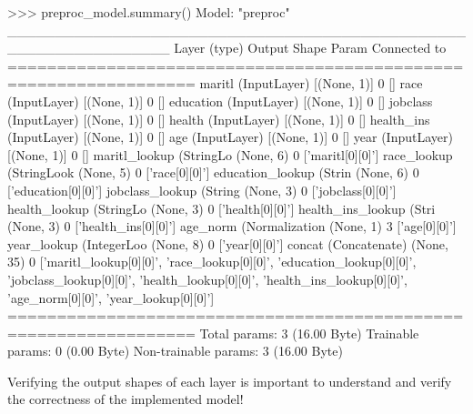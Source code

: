 \begin{textcode}
>>> preproc_model.summary()
Model: "preproc"
_________________________________________________________________
Layer (type)            Output Shape Param Connected to                
=================================================================
maritl (InputLayer)     [(None, 1)]  0     []                            
race (InputLayer)       [(None, 1)]  0     []                            
education (InputLayer)  [(None, 1)]  0     []                            
jobclass (InputLayer)   [(None, 1)]  0     []                            
health (InputLayer)     [(None, 1)]  0     []                            
health_ins (InputLayer) [(None, 1)]  0     []                            
age (InputLayer)        [(None, 1)]  0     []                            
year (InputLayer)       [(None, 1)]  0     []                            
maritl_lookup (StringLo (None, 6)    0     ['maritl[0][0]']              
race_lookup (StringLook (None, 5)    0     ['race[0][0]']                
education_lookup (Strin (None, 6)    0     ['education[0][0]']           
jobclass_lookup (String (None, 3)    0     ['jobclass[0][0]']            
health_lookup (StringLo (None, 3)    0     ['health[0][0]']              
health_ins_lookup (Stri (None, 3)    0     ['health_ins[0][0]']          
age_norm (Normalization (None, 1)    3     ['age[0][0]']                 
year_lookup (IntegerLoo (None, 8)    0     ['year[0][0]']                
concat (Concatenate)    (None, 35)   0     ['maritl_lookup[0][0]',       
                                            'race_lookup[0][0]',         
                                            'education_lookup[0][0]',    
                                            'jobclass_lookup[0][0]',     
                                            'health_lookup[0][0]',       
                                            'health_ins_lookup[0][0]',   
                                            'age_norm[0][0]',            
                                            'year_lookup[0][0]']         
=================================================================
Total params: 3 (16.00 Byte)
Trainable params: 0 (0.00 Byte)
Non-trainable params: 3 (16.00 Byte)
\end{textcode}

\begin{alertbox}
Verifying the output shapes of each layer is important to understand and verify the correctness of the implemented model!
\end{alertbox}

